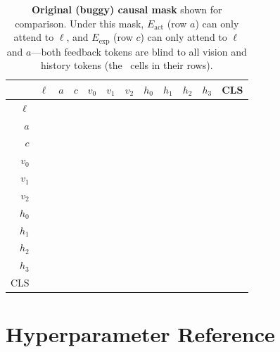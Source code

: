 \documentclass{article}
\newcommand{\cmark}{\ding{51}}
\newcommand{\xmark}{\ding{55}}
\begin{document}
\begin{table}[h]
\centering
\caption{\textbf{Original (buggy) causal mask} shown for comparison. Under this mask,
         $E_{\mathrm{act}}$ (row $a$) can only attend to $\ell$, and $E_{\mathrm{exp}}$ (row $c$)
         can only attend to $\ell$ and $a$---both feedback tokens are blind to all vision and
         history tokens (the \xmark\ cells in their rows).}
\label{tab:mask_wrong}
\scriptsize
\setlength{\tabcolsep}{3.5pt}
\begin{tabular}{r|ccccccccccc}
\toprule
 & $\ell$ & $a$ & $c$ & $v_0$ & $v_1$ & $v_2$ & $h_0$ & $h_1$ & $h_2$ & $h_3$ & CLS \\
\midrule
$\ell$ & \cmark&\xmark&\xmark&\xmark&\xmark&\xmark&\xmark&\xmark&\xmark&\xmark&\xmark \\
$a$    & \cmark&\cmark&\xmark&\xmark&\xmark&\xmark&\xmark&\xmark&\xmark&\xmark&\xmark \\
$c$    & \cmark&\cmark&\cmark&\xmark&\xmark&\xmark&\xmark&\xmark&\xmark&\xmark&\xmark \\
$v_0$  & \cmark&\cmark&\cmark&\cmark&\xmark&\xmark&\xmark&\xmark&\xmark&\xmark&\xmark \\
$v_1$  & \cmark&\cmark&\cmark&\cmark&\cmark&\xmark&\xmark&\xmark&\xmark&\xmark&\xmark \\
$v_2$  & \cmark&\cmark&\cmark&\cmark&\cmark&\cmark&\xmark&\xmark&\xmark&\xmark&\xmark \\
$h_0$  & \cmark&\cmark&\cmark&\cmark&\cmark&\cmark&\cmark&\xmark&\xmark&\xmark&\xmark \\
$h_1$  & \cmark&\cmark&\cmark&\cmark&\cmark&\cmark&\cmark&\cmark&\xmark&\xmark&\xmark \\
$h_2$  & \cmark&\cmark&\cmark&\cmark&\cmark&\cmark&\cmark&\cmark&\cmark&\xmark&\xmark \\
$h_3$  & \cmark&\cmark&\cmark&\cmark&\cmark&\cmark&\cmark&\cmark&\cmark&\cmark&\xmark \\
CLS    & \cmark&\cmark&\cmark&\cmark&\cmark&\cmark&\cmark&\cmark&\cmark&\cmark&\cmark \\
\bottomrule
\end{tabular}
\end{table}

\section{Hyperparameter Reference}
\label{app:hparams}
\end{document}
